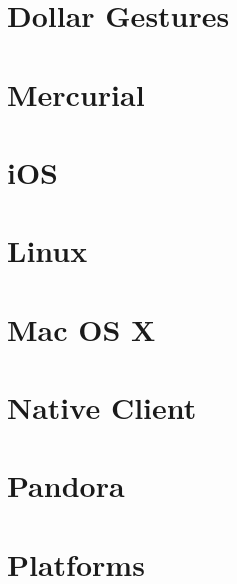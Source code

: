 \documentclass[twoside]{book}
\newcommand{\+}{\discretionary{\mbox{\scriptsize$\hookleftarrow$}}{}{}}
\begin{document}
\chapter{Dollar Gestures}
\label{md__contrib__s_d_l2-2_80_88_docs__r_e_a_d_m_e-gesture}

\chapter{Mercurial}
\label{md__contrib__s_d_l2-2_80_88_docs__r_e_a_d_m_e-hg}

\chapter{i\+OS}
\label{md__contrib__s_d_l2-2_80_88_docs__r_e_a_d_m_e-ios}

\chapter{Linux}
\label{md__contrib__s_d_l2-2_80_88_docs__r_e_a_d_m_e-linux}

\chapter{Mac OS X}
\label{md__contrib__s_d_l2-2_80_88_docs__r_e_a_d_m_e-macosx}

\chapter{Native Client}
\label{md__contrib__s_d_l2-2_80_88_docs__r_e_a_d_m_e-nacl}

\chapter{Pandora}
\label{md__contrib__s_d_l2-2_80_88_docs__r_e_a_d_m_e-pandora}

\chapter{Platforms}
\label{md__contrib__s_d_l2-2_80_88_docs__r_e_a_d_m_e-platforms}

\end{document}
